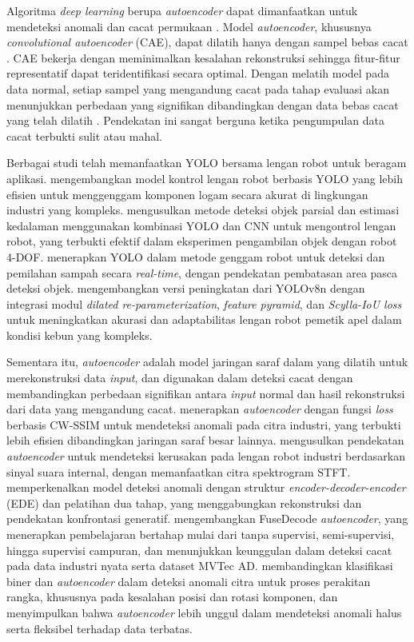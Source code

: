 Algoritma \textit{deep learning} berupa \textit{autoencoder} dapat
dimanfaatkan untuk mendeteksi anomali dan cacat permukaan \citep{7}.
Model \textit{autoencoder}, khususnya \textit{convolutional autoencoder} (CAE),
dapat dilatih hanya dengan sampel bebas cacat \citep{8}. CAE bekerja
dengan meminimalkan kesalahan rekonstruksi sehingga fitur-fitur
representatif dapat teridentifikasi secara optimal. Dengan melatih
model pada data normal, setiap sampel yang mengandung cacat pada tahap
evaluasi akan menunjukkan perbedaan yang signifikan dibandingkan
dengan data bebas cacat yang telah dilatih \citep{9}. Pendekatan ini
sangat berguna ketika pengumpulan data cacat terbukti sulit atau mahal. \par

Berbagai studi telah memanfaatkan YOLO bersama lengan robot untuk
beragam aplikasi. \citet{10} mengembangkan model kontrol
lengan robot berbasis YOLO yang lebih efisien untuk menggenggam
komponen logam secara akurat di lingkungan industri yang kompleks.
\citet{11} mengusulkan metode deteksi objek
parsial dan estimasi kedalaman menggunakan kombinasi YOLO dan CNN
untuk mengontrol lengan robot, yang terbukti efektif dalam eksperimen
pengambilan objek dengan robot 4-DOF. \citet{12} menerapkan YOLO dalam
metode genggam robot untuk deteksi dan
pemilahan sampah secara \textit{real-time}, dengan pendekatan pembatasan area
pasca deteksi objek. \citet{13} mengembangkan versi
peningkatan dari YOLOv8n dengan integrasi modul \textit{dilated
re-parameterization}, \textit{feature pyramid}, dan
\textit{Scylla-IoU loss} untuk
meningkatkan akurasi dan adaptabilitas lengan robot pemetik apel
dalam kondisi kebun yang kompleks. \par

Sementara itu, \textit{autoencoder} adalah model jaringan saraf dalam yang
dilatih untuk merekonstruksi data \textit{input}, dan digunakan dalam deteksi
cacat dengan membandingkan perbedaan signifikan antara \textit{input} normal
dan hasil rekonstruksi dari data yang mengandung cacat. \citet{14}
menerapkan \textit{autoencoder} dengan fungsi \textit{loss} berbasis CW-SSIM
untuk mendeteksi anomali pada citra industri, yang terbukti lebih
efisien dibandingkan jaringan saraf besar lainnya. \citet{15}
mengusulkan pendekatan \textit{autoencoder} untuk mendeteksi kerusakan
pada lengan robot industri berdasarkan sinyal suara internal, dengan
memanfaatkan citra spektrogram STFT. \citet{16} memperkenalkan model
deteksi anomali dengan struktur
\textit{encoder-decoder-encoder} (EDE) dan pelatihan dua tahap, yang
menggabungkan rekonstruksi dan pendekatan konfrontasi generatif.
\citet{17} mengembangkan FuseDecode \textit{autoencoder}, yang
menerapkan pembelajaran bertahap mulai dari tanpa supervisi,
semi-supervisi, hingga supervisi campuran, dan menunjukkan keunggulan
dalam deteksi cacat pada data industri nyata serta dataset MVTec AD.
\citet{18} membandingkan klasifikasi biner
dan \textit{autoencoder} dalam deteksi anomali citra untuk proses
perakitan rangka, khususnya pada kesalahan posisi dan rotasi komponen, dan
menyimpulkan bahwa \textit{autoencoder} lebih unggul dalam mendeteksi anomali
halus serta fleksibel terhadap data terbatas. \par

